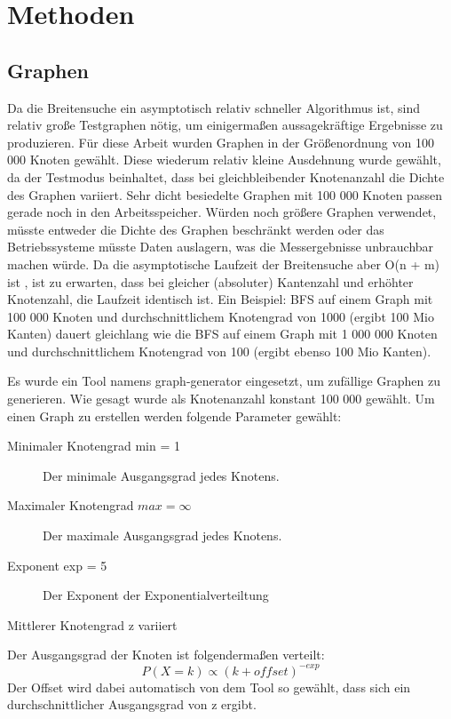 
\chapter{Methoden} %
\label{cha:methoden}

\section{Graphen} %
\label{sec:graphen}
Da die Breitensuche ein asymptotisch relativ schneller Algorithmus ist, sind relativ große Testgraphen nötig, um einigermaßen aussagekräftige Ergebnisse zu produzieren. Für diese Arbeit wurden Graphen in der Größenordnung von 100 000 Knoten gewählt. Diese wiederum relativ kleine Ausdehnung wurde gewählt, da der Testmodus beinhaltet, dass bei gleichbleibender Knotenanzahl die Dichte des Graphen variiert. Sehr dicht besiedelte Graphen mit 100 000 Knoten passen gerade noch in den Arbeitsspeicher. Würden noch größere Graphen verwendet, müsste entweder die Dichte des Graphen beschränkt werden oder das Betriebssysteme müsste Daten auslagern, was die Messergebnisse unbrauchbar machen würde. Da die asymptotische Laufzeit der Breitensuche aber O(n + m) ist \cite{SWB-283374373}, ist zu erwarten, dass bei gleicher (absoluter) Kantenzahl und erhöhter Knotenzahl, die Laufzeit identisch ist. Ein Beispiel: BFS auf einem Graph mit 100 000 Knoten und durchschnittlichem Knotengrad von 1000 (ergibt 100 Mio Kanten) dauert gleichlang wie die BFS auf einem Graph mit 1 000 000 Knoten und durchschnittlichem Knotengrad von 100 (ergibt ebenso 100 Mio Kanten).

Es wurde ein Tool namens graph-generator \cite{graph-generator:2009:Online} eingesetzt, um zufällige Graphen zu generieren. Wie gesagt wurde als Knotenanzahl konstant 100 000 gewählt. Um einen Graph zu erstellen werden folgende Parameter gewählt:
\begin{description}
	\item[Minimaler Knotengrad min = 1] Der minimale Ausgangsgrad jedes Knotens.
	\item[Maximaler Knotengrad $max = \infty$] Der maximale Ausgangsgrad jedes Knotens.
	\item[Exponent exp = 5] Der Exponent der Exponentialverteiltung
	\item[Mittlerer Knotengrad z variiert]
\end{description}
Der Ausgangsgrad der Knoten ist folgendermaßen verteilt:
$$
P(X=k) \propto (k + offset)^{-exp}
$$
Der Offset wird dabei automatisch von dem Tool so gewählt, dass sich ein durchschnittlicher Ausgangsgrad von z ergibt.

